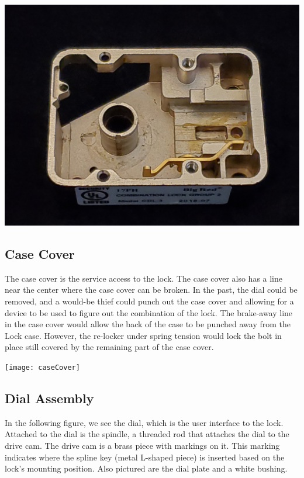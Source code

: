 \documentclass[11pt, letterpaper]{article}
\begin{document}
\begin{center}
  \includegraphics[scale=.075]{lockCase}
\end{center}

\subsection*{Case Cover}
The case cover is the service access to the lock. The case cover also has a line
near the center where the case cover can be broken. In the past, the dial could
be removed, and a would-be thief could punch out the case cover and allowing for
a device to be used to figure out the combination of the lock. The brake-away
line in the case cover would allow the back of the case to be punched away from
the Lock case. However, the re-locker under spring tension would lock the bolt
in place still covered by the remaining part of the case cover.

\begin{center}
  \texttt{[image: caseCover]}
\end{center}

\subsection*{Dial Assembly}
In the following figure, we see the dial, which is the user interface to the lock.
Attached to the dial is the spindle, a threaded rod that attaches the dial to the
drive cam. The drive cam is a brass piece with markings on it. This marking
indicates where the spline key (metal L-shaped piece) is inserted based on the
lock's mounting position. Also pictured are the dial plate and a white bushing.
\end{document}
